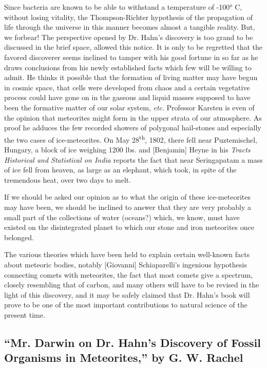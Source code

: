 \documentclass[a4paper, 12pt, oneside]{article}
\begin{document}
Since bacteria are known to be able to withstand a temperature of -100° C, without losing vitality, the Thompson-Richter hypothesis of the propagation of life through the universe in this manner becomes almost a tangible reality. But, we forbear! The perspective opened by Dr. Hahn's discovery is too grand to be discussed in the brief space, allowed this notice. It is only to be regretted that the favored discoverer seems inclined to tamper with his good fortune in so far as he draws conclusions from his newly established facts which few will be willing to admit. He thinks it possible that the formation of living matter may have begun in cosmic space, that cells were developed from chaos and a certain vegetative process could have gone on in the gaseous and liquid masses supposed to have been the formative matter of our solar system, \emph{etc}. Professor Karsten is even of the opinion that meteorites might form in the upper strata of our atmosphere. As proof he adduces the few recorded showers of polygonal hail-stones and especially the two cases of ice-meteorites. On May 28\textsuperscript{th}, 1802, there fell near Puztemischel, Hungary, a block of ice weighing 1200 lbs. and [Benjamin] Heyne in his \emph{Tracts Historical and Statistical on India} reports the fact that near Seringapatam a mass of ice fell from heaven, as large as an elephant, which took, in spite of the tremendous heat, over two days to melt.

If we should be asked our opinion as to what the origin of these ice-meteorites may have been, we should be inclined to answer that they are very probably a small part of the collections of water (oceans?) which, we know, must have existed on the disintegrated planet to which our stone and iron meteorites once belonged.

The various theories which have been held to explain certain well-known facts about meteoric bodies, notably [Giovanni] Schiaparelli's ingenious hypothesis connecting comets with meteorites, the fact that most comets give a spectrum, closely resembling that of carbon, and many others will have to be revised in the light of this discovery, and it may be safely claimed that Dr. Hahn's book will prove to be one of the most important contributions to natural science of the present time.
\clearpage
\subsection{``Mr. Darwin on Dr. Hahn's Discovery of Fossil Organisms in Meteorites,'' by G. W. Rachel}
\end{document}
